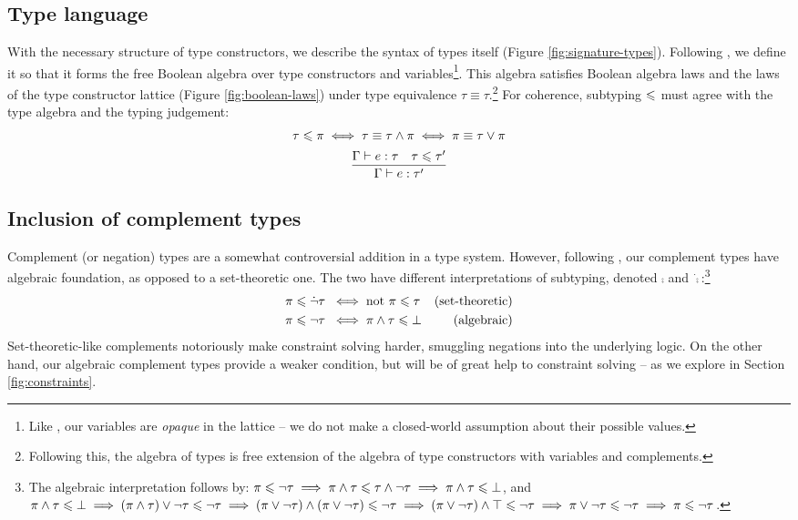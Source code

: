 \subsection{Type language}

With the necessary structure of type constructors, we describe the syntax of types itself (Figure \ref{fig:signature-types}). Following \textcite{mlstruct}, we define it so that it forms the free Boolean algebra over type constructors and variables\footnote{Like \textcite{dolan-thesis}, our variables are \emph{opaque} in the lattice -- we do not make a closed-world assumption about their possible values.}. This algebra satisfies Boolean algebra laws and the laws of the type constructor lattice (Figure \ref{fig:boolean-laws}) under type equivalence $\tau \equiv \tau$.\footnote{Following this, the algebra of types is free extension of the algebra of type constructors with variables and complements.} For coherence, subtyping $\leqslant$ must agree with the type algebra and the typing judgement:
$$ \begin{array}{c}
   \tau \leqslant \pi \iff \tau \equiv \tau \land \pi \iff \pi \equiv \tau \lor \pi \\[5pt]
   \dfrac{\Gamma \vdash e : \tau \quad \tau \leqslant \tau'}{\Gamma \vdash e : \tau'}
\end{array} $$

\subsection{Inclusion of complement types} 
\label{subsec:oh-god-complements}
Complement (or negation) types are a somewhat controversial addition in a type system. However, following \textcite{mlstruct}, our complement types have algebraic foundation, as opposed to a set-theoretic one. The two have different interpretations of subtyping, denoted $\comp$ and $\dot \comp$:\footnote{The algebraic interpretation follows by: $\pi \leqslant \lnot \tau \implies \pi \land \tau \leqslant \tau \land \lnot \tau \implies \pi \land \tau \leqslant \bot$, and $\pi \land \tau \leqslant \bot \implies (\pi \land \tau) \lor \lnot \tau \leqslant \lnot \tau \implies (\pi \lor \lnot \tau) \land (\pi \lor \lnot \tau) \leqslant \lnot \tau \implies (\pi \lor \lnot \tau) \land \top \leqslant \lnot \tau \implies \pi \lor \lnot \tau \leqslant \lnot \tau \implies \pi \leqslant \lnot \tau$.}
\begin{align*}
    \pi \leqslant \dot {\lnot} \tau \;&\iff \text{not } \pi \leqslant \tau & \text{(set-theoretic)} \\
    \pi \leqslant \lnot \tau \;&\iff \pi \land \tau \leqslant \bot & \text{(algebraic)} 
\end{align*}
Set-theoretic-like complements notoriously make constraint solving harder, smuggling negations into the underlying logic. On the other hand, our algebraic complement types provide a weaker condition, but will be of great help to constraint solving -- as we explore in Section \ref{fig:constraints}.

